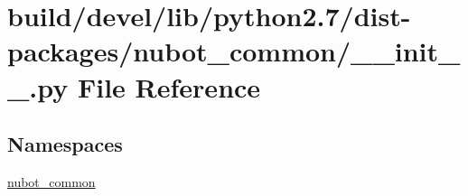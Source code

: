 \hypertarget{build_2devel_2lib_2python2_87_2dist-packages_2nubot__common_2____init_____8py}{\section{build/devel/lib/python2.7/dist-\/packages/nubot\-\_\-common/\-\_\-\-\_\-init\-\_\-\-\_\-.py File Reference}
\label{build_2devel_2lib_2python2_87_2dist-packages_2nubot__common_2____init_____8py}
}
\subsection*{Namespaces}
\begin{DoxyCompactItemize}
\item 
\hyperlink{namespacenubot__common}{nubot\-\_\-common}
\end{DoxyCompactItemize}
